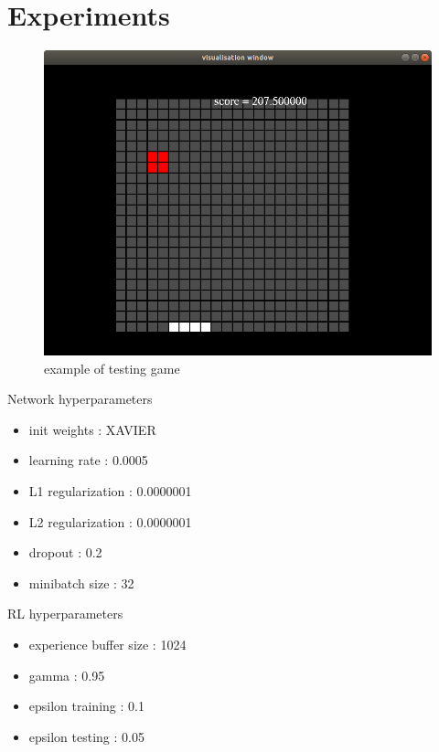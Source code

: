 \documentclass[10pt,a4paper]{article}
\begin{document}
\newpage
\section{Experiments}

\begin{figure}[!htb]
  \centering
  \includegraphics[scale=0.25]{../../diagrams/catcher.png}
  \caption{example of testing game}
  \label{img:dqn_test_game}
\end{figure}

Network hyperparameters
\begin{itemize}
  \item init weights  : XAVIER
  \item learning rate : 0.0005
  \item L1 regularization : 0.0000001
  \item L2 regularization : 0.0000001
  \item dropout           : 0.2
  \item minibatch size    : 32
\end{itemize}

RL hyperparameters
\begin{itemize}
  \item experience buffer size  : 1024
  \item gamma : 0.95
  \item epsilon training : 0.1
  \item epsilon testing : 0.05
\end{itemize}
\end{document}
